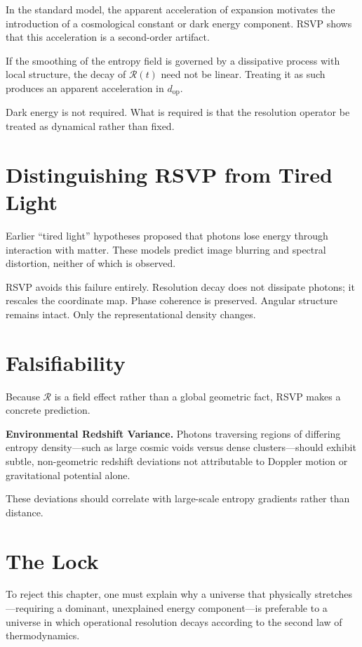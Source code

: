 \documentclass[11pt]{book}
\begin{document}
In the standard model, the apparent acceleration of expansion motivates the introduction of a cosmological constant or dark energy component. RSVP shows that this acceleration is a second-order artifact.

If the smoothing of the entropy field is governed by a dissipative process with local structure, the decay of \(\mathcal{R}(t)\) need not be linear. Treating it as such produces an apparent acceleration in \(d_{\text{op}}\).

Dark energy is not required. What is required is that the resolution operator be treated as dynamical rather than fixed.

\section{Distinguishing RSVP from Tired Light}

Earlier ``tired light'' hypotheses proposed that photons lose energy through interaction with matter. These models predict image blurring and spectral distortion, neither of which is observed.

RSVP avoids this failure entirely. Resolution decay does not dissipate photons; it rescales the coordinate map. Phase coherence is preserved. Angular structure remains intact. Only the representational density changes.

\section{Falsifiability}

Because \(\mathcal{R}\) is a field effect rather than a global geometric fact, RSVP makes a concrete prediction.

\textbf{Environmental Redshift Variance.}
Photons traversing regions of differing entropy density---such as large cosmic voids versus dense clusters---should exhibit subtle, non-geometric redshift deviations not attributable to Doppler motion or gravitational potential alone.

These deviations should correlate with large-scale entropy gradients rather than distance.

\section{The Lock}

To reject this chapter, one must explain why a universe that physically stretches---requiring a dominant, unexplained energy component---is preferable to a universe in which operational resolution decays according to the second law of thermodynamics.
\end{document}

